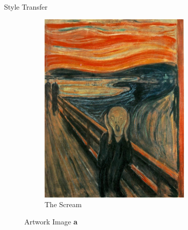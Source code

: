 \documentclass{beamer}
\begin{document}
\begin{frame}{Style Transfer}
\begin{figure}
{\begin{figure}[ht]
    \end{figure}
}{
    \begin{figure}[ht]
    \centering
    \caption*{The Scream}
    \includegraphics[width=0.8\textwidth,height=0.27\textheight]{img/artworks/the-scream}
    \end{figure}
}
\caption*{Artwork Image \textbf{a}}
\end{figure}
\end{frame}
\end{document}
